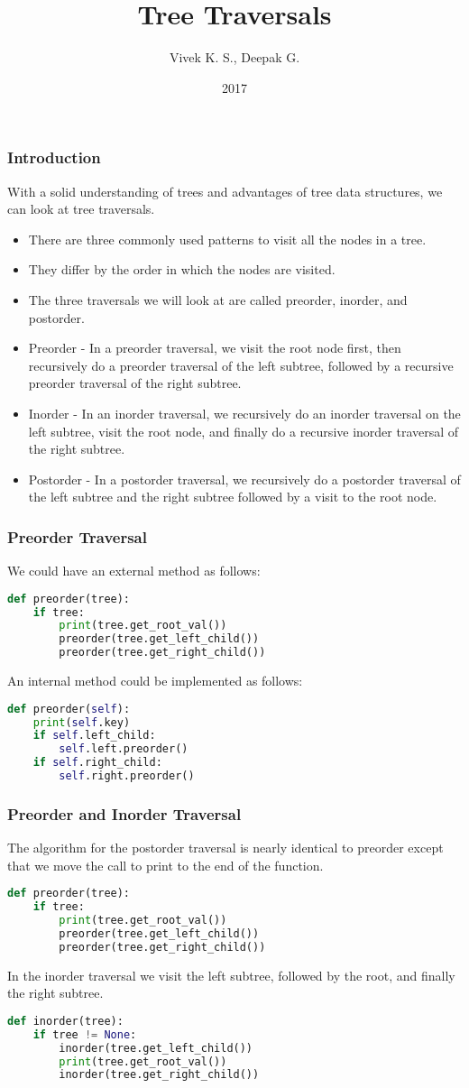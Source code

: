 \documentclass{beamer}
\title{Tree Traversals}
\author{Vivek K. S., Deepak G.}
\institute{Information Systems Decision Sciences (ISDS)\\
MUMA College of Business\\
University of South Florida \\
Tampa, Florida}
\date{2017}
\begin{document}
\frame{\titlepage}
\begin{frame}
\frametitle{Introduction}
With a solid understanding of trees and advantages of tree data structures, we can look at tree traversals.
\begin{itemize}
\item There are three commonly used patterns to visit all the nodes in a tree.
\item They differ by the order in which the nodes are visited.
\item The three traversals we will look at
are called preorder, inorder, and postorder.
\item Preorder - In a preorder traversal, we visit the root node first, then recursively do a preorder traversal of the left subtree, followed by a recursive preorder traversal of the right subtree.
\item Inorder - In an inorder traversal, we recursively do an inorder traversal on the left subtree, visit the root node, and finally do a recursive inorder traversal of the right subtree.
\item Postorder - In a postorder traversal, we recursively do a postorder traversal of the left subtree and the right subtree followed by a visit to the root node.
\end{itemize}
\end{frame}

\begin{frame}[fragile]
\frametitle{Preorder Traversal}
We could have an external method as follows:
\begin{lstlisting}[language=Python]
def preorder(tree):
    if tree:
        print(tree.get_root_val())
        preorder(tree.get_left_child())
        preorder(tree.get_right_child())
\end{lstlisting}

An internal method could be implemented as follows:
\begin{lstlisting}[language=Python]
def preorder(self):
    print(self.key)
    if self.left_child:
        self.left.preorder()
    if self.right_child:
        self.right.preorder()
\end{lstlisting}
\end{frame}

\begin{frame}[fragile]
\frametitle{Preorder and Inorder Traversal}
The algorithm for the postorder traversal is nearly identical to preorder except that we move the call to print to the end of the function.
\begin{lstlisting}[language=Python]
def preorder(tree):
    if tree:
        print(tree.get_root_val())
        preorder(tree.get_left_child())
        preorder(tree.get_right_child())
\end{lstlisting}

In the inorder traversal we visit the left subtree, followed by the root, and finally the right subtree.
\begin{lstlisting}[language=Python]
def inorder(tree):
    if tree != None:
        inorder(tree.get_left_child())
        print(tree.get_root_val())
        inorder(tree.get_right_child())
\end{lstlisting}
\end{frame}
\end{document}
